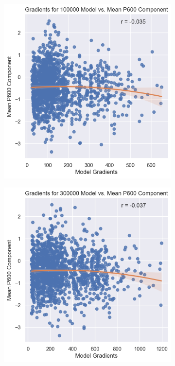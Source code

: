 \documentclass{IEEEtran}
\begin{document}
\begin{figure}[h]
\centering
\begin{subfigure}{0.4\textwidth}
    \centering
    \includegraphics[width=\textwidth]{gradients_vs_p600/100000.png}
\end{subfigure}
\begin{subfigure}{0.4\textwidth}
    \centering
    \includegraphics[width=\textwidth]{gradients_vs_p600/300000.png}
\end{subfigure}
\end{figure}
\end{document}
